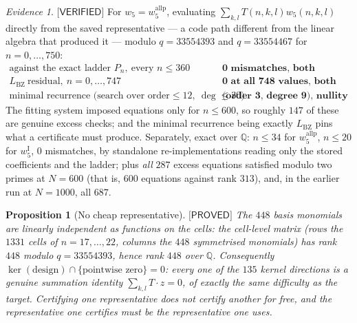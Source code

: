 \documentclass[11pt,reqno]{amsart}
\theoremstyle{plain}
\newtheorem{proposition}[theorem]{Proposition}
\theoremstyle{definition}
\theoremstyle{remark}
\newtheorem{evidence}[theorem]{Evidence}
\numberwithin{equation}{section}
\newcommand{\QQ}{\mathbb{Q}}
\newcommand{\LBZ}{L_{\mathrm{BZ}}}
\newcommand{\wfive}{w_5}
\newcommand{\PROVED}{\textsf{[PROVED]}}
\newcommand{\VERIFIED}{\textsf{[VERIFIED]}}
\begin{document}
\begin{evidence}\label{ev:T1}
$\VERIFIED$ For $\wfive=w_5^{\mathrm{allp}}$, evaluating $\sum_{k,l}T(n,k,l)\wfive(n,k,l)$
directly from the saved representative --- a code path different from the linear algebra that
produced it --- modulo $q=33554393$ and $q=33554467$ for $n=0,\dots,750$:
\[
\begin{array}{ll}
\text{against the exact ladder } P_n,\ \text{every } n\le360 & \textbf{0 mismatches, both primes}\\
\LBZ\ \text{residual},\ n=0,\dots,747 & \textbf{0 at all 748 values, both primes}\\
\text{minimal recurrence (search over order}\le12,\ \deg\le30) & \textbf{(order 3, degree 9), nullity 1}
\end{array}
\]
The fitting system imposed equations only for $n\le600$, so roughly $147$ of these are genuine
excess checks; and the minimal recurrence being exactly $\LBZ$ pins what a certificate must
produce. Separately, exact over $\QQ$: $n\le34$ for $w_5^{\mathrm{allp}}$, $n\le20$ for
$w_5^{\mathrm I}$, $0$ mismatches, by standalone re-implementations reading only the stored
coefficients and the ladder; plus \emph{all} $287$ excess equations satisfied modulo two primes
at $N=600$ (that is, $600$ equations against rank $313$), and, in the earlier run at $N=1000$,
all $687$.
\end{evidence}

\begin{proposition}[No cheap representative]\label{prop:ptrank}
$\PROVED$ The $448$ basis monomials are linearly independent \emph{as functions} on the cells:
the cell-level matrix (rows the $1331$ cells of $n=17,\dots,22$, columns the $448$ symmetrised
monomials) has rank $448$ modulo $q=33554393$, hence rank $448$ over $\QQ$. Consequently
$\ker(\text{design})\cap\{\text{pointwise zero}\}=0$: every one of the $135$ kernel directions
is a genuine \emph{summation} identity $\sum_{k,l}T\cdot z=0$, of exactly the same difficulty as
the target. \emph{Certifying one representative does not certify another for free}, and the
representative one certifies must be the representative one uses.
\end{proposition}
\end{document}
